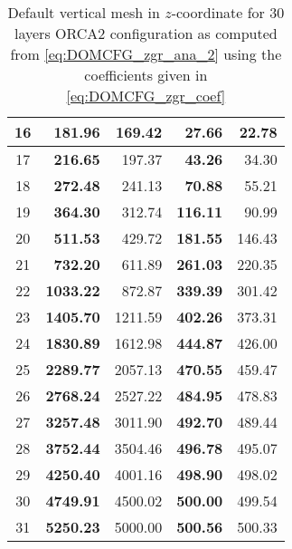 \documentclass[../main/NEMO_manual]{subfiles}
\begin{document}
\begin{table}
\begin{tabular}{c||r|r|r|r}
    \hline
    16             & \textbf{   181.96} &             169.42 & \textbf{   27.66} &            22.78 \\
    \hline
    17             & \textbf{   216.65} &             197.37 & \textbf{   43.26} &            34.30 \\
    \hline
    18             & \textbf{   272.48} &             241.13 & \textbf{   70.88} &            55.21 \\
    \hline
    19             & \textbf{   364.30} &             312.74 & \textbf{  116.11} &            90.99 \\
    \hline
    20             & \textbf{   511.53} &             429.72 & \textbf{  181.55} &           146.43 \\
    \hline
    21             & \textbf{   732.20} &             611.89 & \textbf{  261.03} &           220.35 \\
    \hline
    22             & \textbf{  1033.22} &             872.87 & \textbf{  339.39} &           301.42 \\
    \hline
    23             & \textbf{  1405.70} &            1211.59 & \textbf{  402.26} &           373.31 \\
    \hline
    24             & \textbf{  1830.89} &            1612.98 & \textbf{  444.87} &           426.00 \\
    \hline
    25             & \textbf{  2289.77} &            2057.13 & \textbf{  470.55} &           459.47 \\
    \hline
    26             & \textbf{  2768.24} &            2527.22 & \textbf{  484.95} &           478.83 \\
    \hline
    27             & \textbf{  3257.48} &            3011.90 & \textbf{  492.70} &           489.44 \\
    \hline
    28             & \textbf{  3752.44} &            3504.46 & \textbf{  496.78} &           495.07 \\
    \hline
    29             & \textbf{  4250.40} &            4001.16 & \textbf{  498.90} &           498.02 \\
    \hline
    30             & \textbf{  4749.91} &            4500.02 & \textbf{  500.00} &           499.54 \\
    \hline
    31             & \textbf{  5250.23} &            5000.00 & \textbf{  500.56} &           500.33 \\
    \hline
  \end{tabular}
  \caption[Default vertical mesh in $z$-coordinate for 30 layers ORCA2 configuration]{
    Default vertical mesh in $z$-coordinate for 30 layers ORCA2 configuration as
    computed from \autoref{eq:DOMCFG_zgr_ana_2} using
    the coefficients given in \autoref{eq:DOMCFG_zgr_coef}}
  \label{tab:DOMCFG_orca_zgr}
\end{table}
\end{document}
